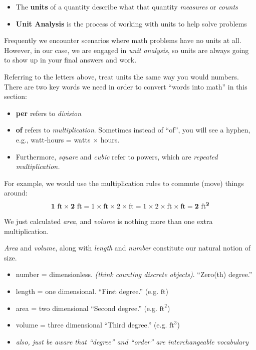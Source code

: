 \documentclass[12pt]{article}
\begin{document}


\begin{itemize}
\item The {\bf units} of a quantity describe what that quantity \emph{measures} or \emph{counts}
\item {\bf Unit Analysis} is the process of working with units to help solve problems
\end{itemize}

Frequently we encounter scenarios where math problems have no units at all.
However, in our case, we are engaged in \emph{unit analysis}, so units are always going to show up in your final answers and work. 


Referring to the letters above, treat units the same way you would numbers.
There are two key words we need in order to convert ``words into math'' in this section:
\begin{itemize}
\item {\bf per} refers to \emph{division} 
\item {\bf of} refers to \emph{multiplication}. Sometimes instead of ``of'', you will see a hyphen, e.g., watt-hours = watts $\times$ hours.
\item Furthermore, \emph{square} and \emph{cubic} refer to powers, which are \emph{repeated multiplication.}
\end{itemize}

\vspace{0.5in}
For example, we would use the multiplication rules to commute (move) things around: 
$$
{\bf 1 \text{ ft} \times 2 \text{ ft} }= 1 \times \text{ft} \times 2 \times \text{ft} = 1 \times 2 \times \text{ft} \times \text{ft} = {\bf 2 \text{ ft}^2 }
$$

We just calculated \emph{area}, and \emph{volume} is nothing more than one extra multiplication. 

\emph{Area} and \emph{volume}, along with \emph{length} and \emph{number} constitute our natural notion of size.
\begin{itemize}
\item number = dimensionless.  \emph{(think counting discrete objects)}. ``Zero(th) degree.''
\item length = one dimensional. ``First degree.'' (e.g. $\text{ft}$)
\item area = two dimensional ``Second degree.'' (e.g. $\text{ft}^2$)
\item volume = three dimensional ``Third degree.'' (e.g. $\text{ft}^3$)
\item \emph{also, just be aware that ``degree'' and ``order'' are interchangeable vocabulary}
\end{itemize}
\end{document}
